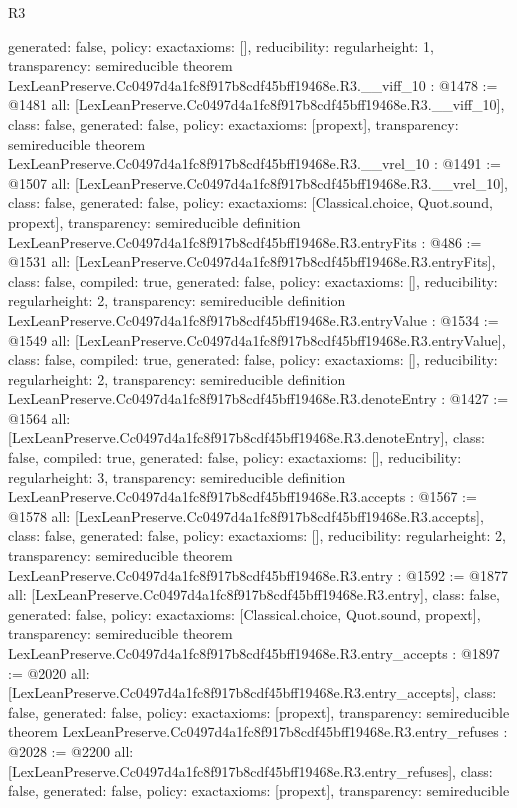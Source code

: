 \begin{lexlean}{R3}
\begin{coremodule}
{  generated: false,
  policy: exact{axioms: []},
  reducibility: regular{height: 1},
  transparency: semireducible
}
theorem LexLeanPreserve.Cc0497d4a1fc8f917b8cdf45bff19468e.R3.__viff_10 : @1478 := @1481 {
  all: [LexLeanPreserve.Cc0497d4a1fc8f917b8cdf45bff19468e.R3.__viff_10],
  class: false,
  generated: false,
  policy: exact{axioms: [propext]},
  transparency: semireducible
}
theorem LexLeanPreserve.Cc0497d4a1fc8f917b8cdf45bff19468e.R3.__vrel_10 : @1491 := @1507 {
  all: [LexLeanPreserve.Cc0497d4a1fc8f917b8cdf45bff19468e.R3.__vrel_10],
  class: false,
  generated: false,
  policy: exact{axioms: [Classical.choice, Quot.sound, propext]},
  transparency: semireducible
}
definition LexLeanPreserve.Cc0497d4a1fc8f917b8cdf45bff19468e.R3.entryFits : @486 := @1531 {
  all: [LexLeanPreserve.Cc0497d4a1fc8f917b8cdf45bff19468e.R3.entryFits],
  class: false,
  compiled: true,
  generated: false,
  policy: exact{axioms: []},
  reducibility: regular{height: 2},
  transparency: semireducible
}
definition LexLeanPreserve.Cc0497d4a1fc8f917b8cdf45bff19468e.R3.entryValue : @1534 := @1549 {
  all: [LexLeanPreserve.Cc0497d4a1fc8f917b8cdf45bff19468e.R3.entryValue],
  class: false,
  compiled: true,
  generated: false,
  policy: exact{axioms: []},
  reducibility: regular{height: 2},
  transparency: semireducible
}
definition LexLeanPreserve.Cc0497d4a1fc8f917b8cdf45bff19468e.R3.denoteEntry : @1427 := @1564 {
  all: [LexLeanPreserve.Cc0497d4a1fc8f917b8cdf45bff19468e.R3.denoteEntry],
  class: false,
  compiled: true,
  generated: false,
  policy: exact{axioms: []},
  reducibility: regular{height: 3},
  transparency: semireducible
}
definition LexLeanPreserve.Cc0497d4a1fc8f917b8cdf45bff19468e.R3.accepts : @1567 := @1578 {
  all: [LexLeanPreserve.Cc0497d4a1fc8f917b8cdf45bff19468e.R3.accepts],
  class: false,
  generated: false,
  policy: exact{axioms: []},
  reducibility: regular{height: 2},
  transparency: semireducible
}
theorem LexLeanPreserve.Cc0497d4a1fc8f917b8cdf45bff19468e.R3.entry : @1592 := @1877 {
  all: [LexLeanPreserve.Cc0497d4a1fc8f917b8cdf45bff19468e.R3.entry],
  class: false,
  generated: false,
  policy: exact{axioms: [Classical.choice, Quot.sound, propext]},
  transparency: semireducible
}
theorem LexLeanPreserve.Cc0497d4a1fc8f917b8cdf45bff19468e.R3.entry_accepts : @1897 := @2020 {
  all: [LexLeanPreserve.Cc0497d4a1fc8f917b8cdf45bff19468e.R3.entry_accepts],
  class: false,
  generated: false,
  policy: exact{axioms: [propext]},
  transparency: semireducible
}
theorem LexLeanPreserve.Cc0497d4a1fc8f917b8cdf45bff19468e.R3.entry_refuses : @2028 := @2200 {
  all: [LexLeanPreserve.Cc0497d4a1fc8f917b8cdf45bff19468e.R3.entry_refuses],
  class: false,
  generated: false,
  policy: exact{axioms: [propext]},
  transparency: semireducible
}


\end{coremodule}
\end{lexlean}
